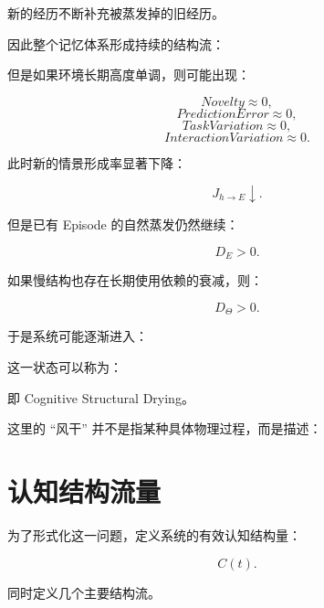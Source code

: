 新的经历不断补充被蒸发掉的旧经历。

因此整个记忆体系形成持续的结构流：

\begin{statementbox}
\centering
{}
\end{statementbox}

但是如果环境长期高度单调，则可能出现：

\[
Novelty\approx 0,
\]
\[
PredictionError\approx 0,
\]
\[
TaskVariation\approx 0,
\]
\[
InteractionVariation\approx 0.
\]

此时新的情景形成率显著下降：

\[
J_{h\rightarrow E}\downarrow.
\]

但是已有 Episode 的自然蒸发仍然继续：

\[
D_E>0.
\]

如果慢结构也存在长期使用依赖的衰减，则：

\[
D_\Theta>0.
\]

于是系统可能逐渐进入：

\begin{statementbox}
\centering
{}
\end{statementbox}

这一状态可以称为：

\begin{statementbox}
\centering
{}
\end{statementbox}

即 Cognitive Structural Drying。

这里的 ``风干'' 并不是指某种具体物理过程，而是描述：

\begin{statementbox}
\centering
{}
\end{statementbox}

\section{认知结构流量}

为了形式化这一问题，定义系统的有效认知结构量：

\[
C(t).
\]

同时定义几个主要结构流。

